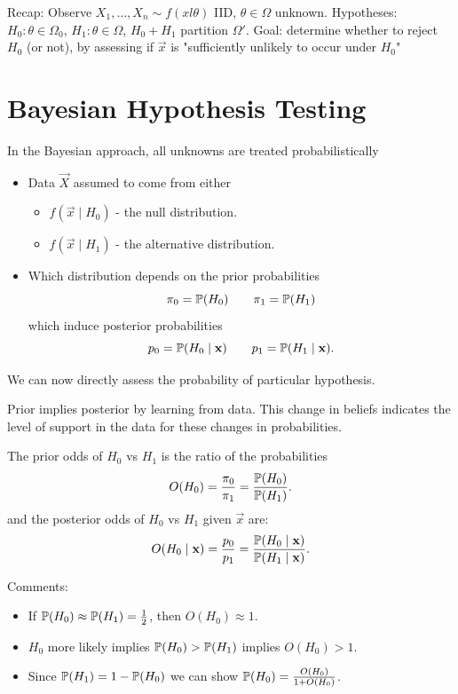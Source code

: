 \documentclass[10pt, a4paper]{article}
\begin{document}
Recap:
Observe $X_1, \dotsc, X_n \sim f(xl \theta)$ IID,
$\theta \in \Omega$ unknown.
Hypotheses:
$H_0 : \theta \in \Omega_0$,
$H_1 : \theta \in \Omega$,
$H_0 + H_1$ partition $\Omega'$.
Goal:
determine whether to reject $H_0$
(or not),
by assessing if $\vec{x}$ is
"sufficiently unlikely to occur under $H_0$"

\newpage

\section{Bayesian Hypothesis Testing}
In the Bayesian approach,
all unknowns are treated probabilistically
\begin{itemize}[label = -]
    \item Data $\vec{X}$ assumed to come from either
    \begin{itemize}
        \item $f(\vec{x} \mid H_0)$ -
        the null distribution.

        \item $f(\vec{x} \mid H_1)$ -
        the alternative distribution.
    \end{itemize}

    \item Which distribution depends on the prior probabilities
    \[
    \pi_0 = \P(H_0)\qquad \pi_1 = \P(H_1)
    \]
    which induce posterior probabilities
    \[
    p_0 = \P(H_0 \mid \vec{x})\qquad p_1 = \P(H_1 \mid \vec{x}).
    \]
\end{itemize}

We can now directly assess the probability of particular hypothesis.

Prior implies posterior by learning from data.
This change in beliefs indicates the level of support in the data for these changes in probabilities.
\begin{definition}
    The prior odds of $H_0$ vs $H_1$ is the ratio of the probabilities
    \[
    O(H_0) = \frac{\pi_0}{\pi_1} = \frac{\P(H_0)}{\P(H_1)}.
    \]
    and the posterior odds of $H_0$ vs $H_1$ given $\vec{x}$ are:
    \[
    O(H_0 \mid \vec{x}) = \frac{p_0}{p_1} = \frac{\P(H_0 \mid \vec{x})}{\P(H_1 \mid \vec{x})}.
    \]
\end{definition}

Comments:
\begin{itemize}
    \item If $\P(H_0) \approx \P(H_1) = \frac{1}{2}$,
    then $O(H_0) \approx 1$.

    \item $H_0$ more likely implies $\P(H_0) > \P(H_1)$ implies $O(H_0) > 1$.

    \item Since $\P(H_1) = 1 - \P(H_0)$ we can show $\P(H_0) = \frac{O(H_0)}{1 + O(H_0)}$.
\end{itemize}
\end{document}
